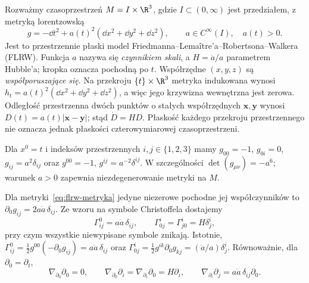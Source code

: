 
\begin{przyklad}
\label{prz:flrw-metryka}
Rozważmy czasoprzestrzeń $M=I\times\R^3$, gdzie $I\subset(0,\infty)$
jest przedziałem, z metryką lorentzowską
\begin{equation}\label{eq:flrw-metryka}
 g=-\dd t^2+a(t)^2(\dd x^2+\dd y^2+\dd z^2),
 \qquad a\in C^\infty(I),\quad a(t)>0.
\end{equation}
Jest to przestrzennie płaski model Friedmanna--Lemaître'a--Robertsona--Walkera
(FLRW). Funkcja $a$ nazywa się \emph{czynnikiem skali}, a
$H=\dot a/a$ parametrem Hubble'a; kropka oznacza pochodną po $t$.
Współrzędne $(x,y,z)$ są \emph{współporuszające się}.
Na przekroju $\{t\}\times\R^3$ metryka indukowana wynosi
$h_t=a(t)^2(\dd x^2+\dd y^2+\dd z^2)$, a więc jego
krzywizna wewnętrzna jest zerowa. Odległość przestrzenna dwóch
punktów o stałych współrzędnych $\mathbf x,\mathbf y$ wynosi
$D(t)=a(t)|\mathbf x-\mathbf y|$; stąd $\dot D=HD$.
Płaskość każdego przekroju przestrzennego nie oznacza jednak
płaskości czterowymiarowej czasoprzestrzeni.

Dla $x^0=t$ i indeksów przestrzennych $i,j\in\{1,2,3\}$
mamy $g_{00}=-1$, $g_{0i}=0$, $g_{ij}=a^2\delta_{ij}$
oraz $g^{00}=-1$, $g^{ij}=a^{-2}\delta^{ij}$.
W szczególności $\det(g_{\mu\nu})=-a^6$; warunek $a>0$
zapewnia niezdegenerowanie metryki na $M$.
\end{przyklad}


\begin{przyklad}
\label{prz:flrw-christoffel}
Dla metryki~\eqref{eq:flrw-metryka} jedyne niezerowe
pochodne jej współczynników to
$\partial_0 g_{ij}=2a\dot a\,\delta_{ij}$.
Ze wzoru na symbole Christoffela dostajemy
\begin{equation}\label{eq:flrw-christoffel}
 \Gamma^0_{ij}=a\dot a\,\delta_{ij},\qquad
 \Gamma^i_{0j}=\Gamma^i_{j0}=H\delta^i_j,
\end{equation}
przy czym wszystkie niewypisane symbole znikają.
Istotnie,
$\Gamma^0_{ij}=\tfrac12g^{00}(-\partial_0g_{ij})
=a\dot a\,\delta_{ij}$ oraz
$\Gamma^i_{0j}=\tfrac12g^{ik}\partial_0g_{kj}
=(\dot a/a)\delta^i_j$.
Równoważnie, dla $\partial_0=\partial_t$,
\[
 \nabla_{\partial_0}\partial_0=0,\qquad
 \nabla_{\partial_0}\partial_i
 =\nabla_{\partial_i}\partial_0=H\partial_i,\qquad
 \nabla_{\partial_i}\partial_j=a\dot a\,\delta_{ij}\partial_0.
\]
\end{przyklad}

